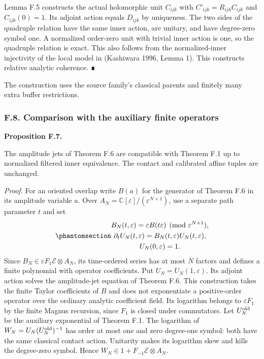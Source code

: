 \documentclass[
  english,
  11pt,
  reqno]{amsart}
\makeatletter
\newcommand{\pandocstatementheading}[1]{%
  \par\addpenalty{\@beginparpenalty}%
  \addvspace{.5\baselineskip plus .2\baselineskip minus .2\baselineskip}%
  {\normalfont\bfseries #1\par}%
  \nobreak\@afterindenttrue\@afterheading
}
\makeatother
\begin{document}
Lemma F.5 constructs the actual holomorphic unit \(C_{ijk}\) with
\(C'_{ijk}=R_{ijk}C_{ijk}\) and \(C_{ijk}(0)=1\). Its adjoint action
equals \(D_{ijk}\) by uniqueness. The two sides of the quadruple
relation have the same inner action, are unitary, and have degree-zero
symbol one. A normalized order-zero unit with trivial inner action is
one, so the quadruple relation is exact. This also follows from the
normalized-inner injectivity of the local model in (Kashiwara 1996,
Lemma 1). This constructs relative analytic coherence. ∎

The construction uses the source family's classical parents and finitely
many extra buffer restrictions.

\protect{}\label{sec:gg-op-analytic-finite-comparison}

\subsubsection{F.8. Comparison with the auxiliary finite
operators}\label{f.8.-comparison-with-the-auxiliary-finite-operators}

\pandocstatementheading{\protect{}\label{prop:gg-op-analytic-finite-comparison}Proposition F.7.}

The amplitude jets of Theorem F.6 are compatible with Theorem F.1 up to
normalized filtered inner equivalence. The contact and calibrated affine
tuples are unchanged.

\emph{Proof.} For an oriented overlap write \(B(a)\) for the generator
of Theorem F.6 in its amplitude variable \(a\). Over
\(A_N=\mathbb C[\varepsilon]/(\varepsilon^{N+1})\), use a separate path
parameter \(t\) and set
\begin{equation}\protect\phantomsection\label{eq:gg-op-finite-fundamental-unit}{\begin{gathered}
B_N(t,\varepsilon)=\varepsilon B(t\varepsilon)\pmod{\varepsilon^{N+1}}, \\
\partial_t U_N(t,\varepsilon)=B_N(t,\varepsilon)U_N(t,\varepsilon), \\
U_N(0,\varepsilon)=1.
\end{gathered}}\end{equation} Since \(B_N\in\varepsilon F_1\mathcal E\otimes A_N\),
its time-ordered series has at most \(N\) factors and defines a finite
polynomial with operator coefficients. Put \(U_N=U_N(1,\varepsilon)\).
Its adjoint action solves the amplitude-jet equation of Theorem F.6.
This construction takes the finite Taylor coefficients of \(B\) and does
not exponentiate a positive-order operator over the ordinary analytic
coefficient field. Its logarithm belongs to \(\varepsilon F_1\) by the
finite Magnus recursion, since \(F_1\) is closed under commutators. Let
\(U_N^{\rm old}\) be the auxiliary exponential of Theorem F.1. The
logarithm of \(W_N=U_N(U_N^{\rm old})^{-1}\) has order at most one and
zero degree-one symbol: both have the same classical contact action.
Unitarity makes its logarithm skew and kills the degree-zero symbol.
Hence \(W_N\in1+F_{-1}\mathcal E\otimes A_N\).
\end{document}
